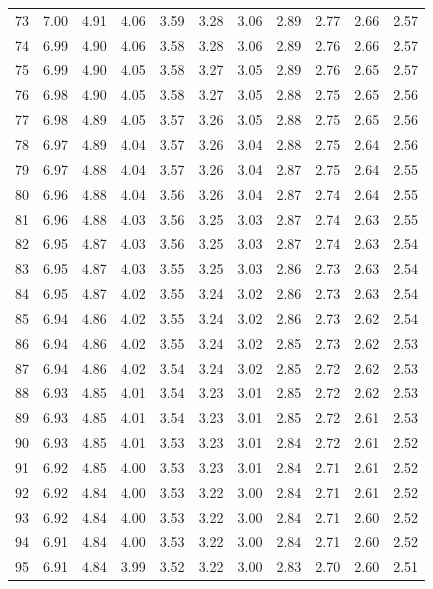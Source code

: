 \documentclass[
]{book}
\theoremstyle{definition}
\theoremstyle{definition}
\theoremstyle{definition}
\theoremstyle{definition}
\theoremstyle{remark}
\begin{document}
\begin{longtable}[]{@{}ccccccccccc@{}}
73 & 7.00 & 4.91 & 4.06 & 3.59 & 3.28 & 3.06 & 2.89 & 2.77 & 2.66 & 2.57 \\
74 & 6.99 & 4.90 & 4.06 & 3.58 & 3.28 & 3.06 & 2.89 & 2.76 & 2.66 & 2.57 \\
75 & 6.99 & 4.90 & 4.05 & 3.58 & 3.27 & 3.05 & 2.89 & 2.76 & 2.65 & 2.57 \\
76 & 6.98 & 4.90 & 4.05 & 3.58 & 3.27 & 3.05 & 2.88 & 2.75 & 2.65 & 2.56 \\
77 & 6.98 & 4.89 & 4.05 & 3.57 & 3.26 & 3.05 & 2.88 & 2.75 & 2.65 & 2.56 \\
78 & 6.97 & 4.89 & 4.04 & 3.57 & 3.26 & 3.04 & 2.88 & 2.75 & 2.64 & 2.56 \\
79 & 6.97 & 4.88 & 4.04 & 3.57 & 3.26 & 3.04 & 2.87 & 2.75 & 2.64 & 2.55 \\
80 & 6.96 & 4.88 & 4.04 & 3.56 & 3.26 & 3.04 & 2.87 & 2.74 & 2.64 & 2.55 \\
81 & 6.96 & 4.88 & 4.03 & 3.56 & 3.25 & 3.03 & 2.87 & 2.74 & 2.63 & 2.55 \\
82 & 6.95 & 4.87 & 4.03 & 3.56 & 3.25 & 3.03 & 2.87 & 2.74 & 2.63 & 2.54 \\
83 & 6.95 & 4.87 & 4.03 & 3.55 & 3.25 & 3.03 & 2.86 & 2.73 & 2.63 & 2.54 \\
84 & 6.95 & 4.87 & 4.02 & 3.55 & 3.24 & 3.02 & 2.86 & 2.73 & 2.63 & 2.54 \\
85 & 6.94 & 4.86 & 4.02 & 3.55 & 3.24 & 3.02 & 2.86 & 2.73 & 2.62 & 2.54 \\
86 & 6.94 & 4.86 & 4.02 & 3.55 & 3.24 & 3.02 & 2.85 & 2.73 & 2.62 & 2.53 \\
87 & 6.94 & 4.86 & 4.02 & 3.54 & 3.24 & 3.02 & 2.85 & 2.72 & 2.62 & 2.53 \\
88 & 6.93 & 4.85 & 4.01 & 3.54 & 3.23 & 3.01 & 2.85 & 2.72 & 2.62 & 2.53 \\
89 & 6.93 & 4.85 & 4.01 & 3.54 & 3.23 & 3.01 & 2.85 & 2.72 & 2.61 & 2.53 \\
90 & 6.93 & 4.85 & 4.01 & 3.53 & 3.23 & 3.01 & 2.84 & 2.72 & 2.61 & 2.52 \\
91 & 6.92 & 4.85 & 4.00 & 3.53 & 3.23 & 3.01 & 2.84 & 2.71 & 2.61 & 2.52 \\
92 & 6.92 & 4.84 & 4.00 & 3.53 & 3.22 & 3.00 & 2.84 & 2.71 & 2.61 & 2.52 \\
93 & 6.92 & 4.84 & 4.00 & 3.53 & 3.22 & 3.00 & 2.84 & 2.71 & 2.60 & 2.52 \\
94 & 6.91 & 4.84 & 4.00 & 3.53 & 3.22 & 3.00 & 2.84 & 2.71 & 2.60 & 2.52 \\
95 & 6.91 & 4.84 & 3.99 & 3.52 & 3.22 & 3.00 & 2.83 & 2.70 & 2.60 & 2.51 \\

\end{longtable}
\end{document}

